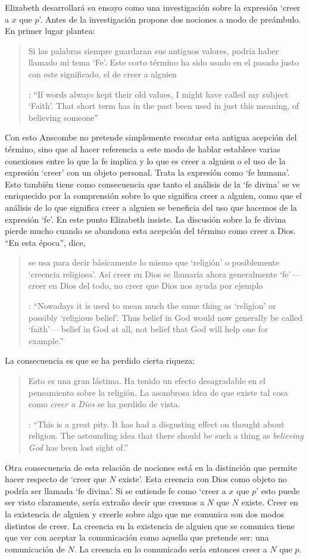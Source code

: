 Elizabeth desarrollará su ensayo como una investigación sobre la expresión \enquote*{creer a $x$ que $p$}. Antes de la investigación propone dos nociones a modo de preámbulo. En primer lugar plantea: \blockquote[{\cite[1]{anscombe2008faith:tobelieve}}: \enquote{If words always kept their old values, I might have called my subject `Faith'. That short term has in the past been used in just this meaning, of believing someone}]{Si las palabras siempre guardaran sus antiguos valores, podría haber llamado mi tema `Fe'. Este corto término ha sido usado en el pasado justo con este significado, el de creer a alguien}. Con esto Anscombe no pretende simplemente rescatar esta antigua acepción del término, sino que al hacer referencia a este modo de hablar establece varias conexiones entre lo que la fe implica y lo que es creer a alguien o el uso de la expresión `creer' con un objeto personal. Trata la expresión como `fe humana'. Esto también tiene como consecuencia que tanto el análisis de la `fe divina' se ve enriquecido por la comprensión sobre lo que significa creer a alguien, como que el análisis de lo que significa creer a alguien se beneficia del uso que hacemos de la expresión `fe'. En este punto Elizabeth insiste. La discusión sobre la fe divina pierde mucho cuando se abandona esta acepción del término como creer a Dios. \enquote{En esta época}, dice, \blockquote[{\cite{anscombe2008faith:tobelieve}}: \enquote{Nowadays it is used to mean much the same thing as `religion' or possibly `religious belief'. Thus belief in God would now generally be called `faith'\,---\,belief in God at all, not belief that God will help one for example.}]{se usa para decir básicamente lo mismo que `religión' o posiblemente `creencia religiosa'. Así creer en Dios se llamaría ahora generalmente `fe'\,---\,creer en Dios del todo, no creer que Dios nos ayuda por ejemplo}. La consecuencia es que se ha perdido cierta riqueza: \blockquote[{\cite{anscombe2008faith:tobelieve}}: \enquote{This is a great pity. It has had a disgusting effect on thought about religion. The astounding idea that there should be such a thing as \emph{believing God} has been lost sight of.}]{Esto es una gran lástima. Ha tenido un efecto desagradable en el pensamiento sobre la religión. La asombrosa idea de que existe tal cosa como \emph{creer a Dios} se ha perdido de vista.}

Otra consecuencia de esta relación de nociones está en la distinción que permite hacer respecto de \enquote*{creer que $N$ existe}. Esta creencia con Dios como objeto no podría ser llamada `fe divina'. Si se entiende fe como \enquote*{creer a $x$ que $p$} esto puede ser visto claramente, sería extraño decir que creemos a $N$ que $N$ existe. Creer en la existencia de alguien y creerle sobre algo que me comunica son dos modos distintos de creer. La creencia en la existencia de alguien que se comunica tiene que ver con aceptar la comunicación como aquello que pretende ser: una comunicación de $N$. La creencia en lo comunicado sería entonces creer a $N$ que $p$.


